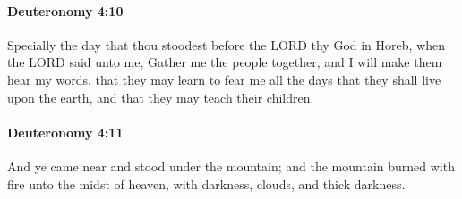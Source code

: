 		\paragraph{Deuteronomy 4:10} %
			\label{DEUTERONOMY-4-10}

			Specially the day that thou stoodest before the LORD thy God in Horeb, when the LORD said unto me, Gather me the people together, and I will make them hear my words, that they may learn to fear me all the days that they shall live upon the earth, and that they may teach their children.


		\paragraph{Deuteronomy 4:11} %
			\label{DEUTERONOMY-4-11}

			And ye came near and stood under the mountain; and the mountain burned with fire unto the midst of heaven, with darkness, clouds, and thick darkness.

